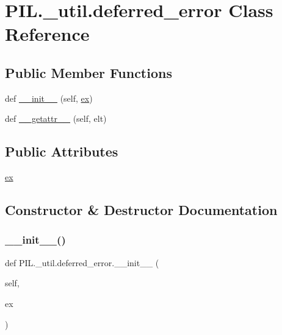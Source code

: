 \hypertarget{classPIL_1_1__util_1_1deferred__error}{}\section{P\+I\+L.\+\_\+util.\+deferred\+\_\+error Class Reference}
\label{classPIL_1_1__util_1_1deferred__error}
\subsection*{Public Member Functions}
\begin{DoxyCompactItemize}
\item 
def \hyperlink{classPIL_1_1__util_1_1deferred__error_a1a1dee4a4add04dc885a2ab85437628c}{\+\_\+\+\_\+init\+\_\+\+\_\+} (self, \hyperlink{classPIL_1_1__util_1_1deferred__error_a07ae3b0a2f1cd90209effce8ea672505}{ex})
\item 
def \hyperlink{classPIL_1_1__util_1_1deferred__error_a7ca8673d5e8cec9b7a2e7ee4ab904297}{\+\_\+\+\_\+getattr\+\_\+\+\_\+} (self, elt)
\end{DoxyCompactItemize}
\subsection*{Public Attributes}
\begin{DoxyCompactItemize}
\item 
\hyperlink{classPIL_1_1__util_1_1deferred__error_a07ae3b0a2f1cd90209effce8ea672505}{ex}
\end{DoxyCompactItemize}


\subsection{Constructor \& Destructor Documentation}
\mbox{\label{classPIL_1_1__util_1_1deferred__error_a1a1dee4a4add04dc885a2ab85437628c}} 
\subsubsection{\texorpdfstring{\+\_\+\+\_\+init\+\_\+\+\_\+()}{\_\_init\_\_()}}
{\footnotesize\ttfamily def P\+I\+L.\+\_\+util.\+deferred\+\_\+error.\+\_\+\+\_\+init\+\_\+\+\_\+ (\begin{DoxyParamCaption}\item[{}]{self,  }\item[{}]{ex }\end{DoxyParamCaption})}



